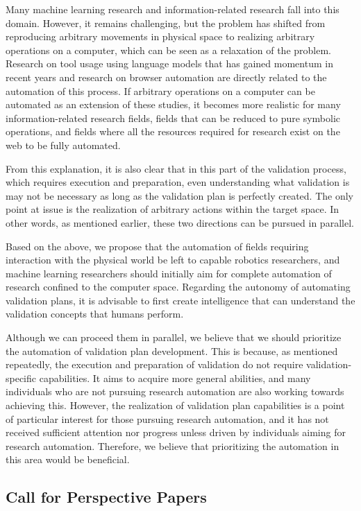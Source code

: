 \documentclass{book}
\begin{document}
Many machine learning research and information-related research fall into this domain. However, it remains challenging, but the problem has shifted from reproducing arbitrary movements in physical space to realizing arbitrary operations on a computer, which can be seen as a relaxation of the problem. Research on tool usage using language models that has gained momentum in recent years and research on browser automation are directly related to the automation of this process. If arbitrary operations on a computer can be automated as an extension of these studies, it becomes more realistic for many information-related research fields, fields that can be reduced to pure symbolic operations, and fields where all the resources required for research exist on the web to be fully automated.

From this explanation, it is also clear that in this part of the validation process, which requires execution and preparation, even understanding what validation is may not be necessary as long as the validation plan is perfectly created. The only point at issue is the realization of arbitrary actions within the target space. In other words, as mentioned earlier, these two directions can be pursued in parallel.

Based on the above, we propose that the automation of fields requiring interaction with the physical world be left to capable robotics researchers, and machine learning researchers should initially aim for complete automation of research confined to the computer space. Regarding the autonomy of automating validation plans, it is advisable to first create intelligence that can understand the validation concepts that humans perform. 

Although we can proceed them in parallel, we believe that we should prioritize the automation of validation plan development. This is because, as mentioned repeatedly, the execution and preparation of validation do not require validation-specific capabilities. It aims to acquire more general abilities, and many individuals who are not pursuing research automation are also working towards achieving this. However, the realization of validation plan capabilities is a point of particular interest for those pursuing research automation, and it has not received sufficient attention nor progress unless driven by individuals aiming for research automation. Therefore, we believe that prioritizing the automation in this area would be beneficial.

\subsection{Call for Perspective Papers}
\end{document}
